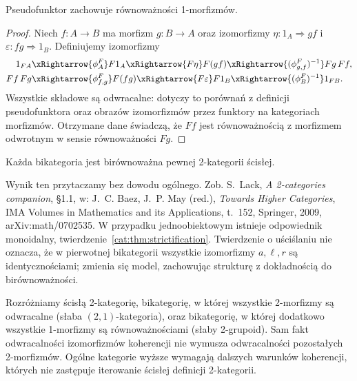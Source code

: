\begin{stwierdzenie}\label{cat:prop:pseudofunctor-preserves-equivalence}
Pseudofunktor zachowuje równoważności 1-morfizmów.
\end{stwierdzenie}
\begin{proof}
Niech $f:A\to B$ ma morfizm $g:B\to A$ oraz izomorfizmy $\eta:1_A\Rightarrow gf$ i $\varepsilon:fg\Rightarrow1_B$. Definiujemy izomorfizmy
\[
\begin{aligned}
 1_{FA}&\xRightarrow{\phi^F_A}F1_A
       \xRightarrow{F\eta}F(gf)
       \xRightarrow{(\phi^F_{g,f})^{-1}}Fg\,Ff,\\
 Ff\,Fg&\xRightarrow{\phi^F_{f,g}}F(fg)
       \xRightarrow{F\varepsilon}F1_B
       \xRightarrow{(\phi^F_B)^{-1}}1_{FB}.
\end{aligned}
\]
Wszystkie składowe są odwracalne: dotyczy to porównań z definicji pseudofunktora oraz obrazów izomorfizmów przez funktory na kategoriach morfizmów. Otrzymane dane świadczą, że $Ff$ jest równoważnością z morfizmem odwrotnym w sensie równoważności $Fg$.
\end{proof}

\begin{twierdzenie}\label{cat:thm:bicat-strictification}
Każda bikategoria jest birównoważna pewnej 2-kategorii ścisłej.
\end{twierdzenie}
Wynik ten przytaczamy bez dowodu ogólnego. Zob. S.~Lack, \emph{A 2-categories companion}, §1.1, w: J.~C. Baez, J.~P. May (red.), \emph{Towards Higher Categories}, IMA Volumes in Mathematics and its Applications, t.~152, Springer, 2009, arXiv:math/0702535. W przypadku jednoobiektowym istnieje odpowiednik monoidalny, twierdzenie~\ref{cat:thm:strictification}. Twierdzenie o uściślaniu nie oznacza, że w pierwotnej bikategorii wszystkie izomorfizmy $a,\ell,r$ są identycznościami; zmienia się model, zachowując strukturę z dokładnością do birównoważności.

\begin{uwaga}
Rozróżniamy ścisłą 2-kategorię, bikategorię, w której wszystkie 2-morfizmy są odwracalne (słaba $(2,1)$-kategoria), oraz bikategorię, w której dodatkowo wszystkie 1-morfizmy są równoważnościami (słaby 2-grupoid). Sam fakt odwracalności izomorfizmów koherencji nie wymusza odwracalności pozostałych 2-morfizmów. Ogólne kategorie wyższe wymagają dalszych warunków koherencji, których nie zastępuje iterowanie ścisłej definicji 2-kategorii.
\end{uwaga}
